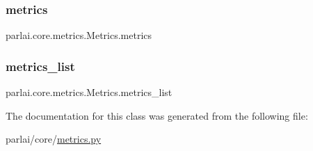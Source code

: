 \subsubsection{\texorpdfstring{metrics}{metrics}}
{\footnotesize\ttfamily parlai.\+core.\+metrics.\+Metrics.\+metrics}

\mbox{\label{classparlai_1_1core_1_1metrics_1_1Metrics_ae0d3620f86dd5cd08e4d1c097ac6dde4}} 
\subsubsection{\texorpdfstring{metrics\+\_\+list}{metrics\_list}}
{\footnotesize\ttfamily parlai.\+core.\+metrics.\+Metrics.\+metrics\+\_\+list}



The documentation for this class was generated from the following file\+:\begin{DoxyCompactItemize}
\item 
parlai/core/\hyperlink{metrics_8py}{metrics.\+py}\end{DoxyCompactItemize}
